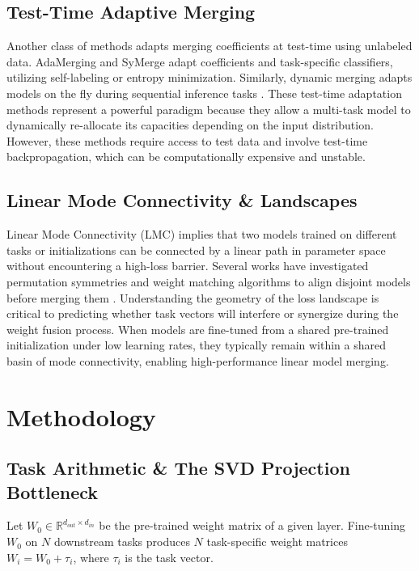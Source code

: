 \documentclass{article}
\begin{document}
\subsection{Test-Time Adaptive Merging}
Another class of methods adapts merging coefficients at test-time using unlabeled data. AdaMerging \cite{yang2023adamerging, Yang2023AdaMergingAM} and SyMerge \cite{jung2024symerge} adapt coefficients and task-specific classifiers, utilizing self-labeling or entropy minimization. Similarly, dynamic merging adapts models on the fly during sequential inference tasks \cite{Tang2025MergingMO, Corbeil2025AMA, Du2025AdaMMSMM}. These test-time adaptation methods represent a powerful paradigm because they allow a multi-task model to dynamically re-allocate its capacities depending on the input distribution. However, these methods require access to test data and involve test-time backpropagation, which can be computationally expensive and unstable.

\subsection{Linear Mode Connectivity \& Landscapes}
Linear Mode Connectivity (LMC) implies that two models trained on different tasks or initializations can be connected by a linear path in parameter space without encountering a high-loss barrier. Several works have investigated permutation symmetries and weight matching algorithms to align disjoint models before merging them \cite{Ito2025DoWR, Sharma2024TheNM}. Understanding the geometry of the loss landscape is critical to predicting whether task vectors will interfere or synergize during the weight fusion process. When models are fine-tuned from a shared pre-trained initialization under low learning rates, they typically remain within a shared basin of mode connectivity, enabling high-performance linear model merging.

\section{Methodology}
\label{methodology}

\subsection{Task Arithmetic \& The SVD Projection Bottleneck}
Let $W_0 \in \mathbb{R}^{d_{out} \times d_{in}}$ be the pre-trained weight matrix of a given layer. Fine-tuning $W_0$ on $N$ downstream tasks produces $N$ task-specific weight matrices $W_i = W_0 + \tau_i$, where $\tau_i$ is the task vector. 
\end{document}
